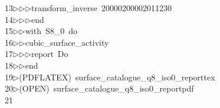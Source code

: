 \begin{tabbing}
13\>$\triangleright$\>$\triangleright$\>$\triangleright$\>transform\_inverse\ 20000200002011230\ \\[0pt]
14\>$\triangleright$\>$\triangleright$\>$\triangleright$\>end\ \\[0pt]
15\>$\triangleright$\>$\triangleright$\>with\ S8\_0\ do\ \\[0pt]
16\>$\triangleright$\>$\triangleright$\>cubic\_surface\_activity\ \\[0pt]
17\>$\triangleright$\>$\triangleright$\>$\triangleright$\>report\ Do\ \\[0pt]
18\>$\triangleright$\>$\triangleright$\>end\\[0pt]
19\>$\triangleright$\>(PDFLATEX)\ surface\_catalogue\_q8\_iso0\_reporttex\\[0pt]
20\>$\triangleright$\>(OPEN)\ surface\_catalogue\_q8\_iso0\_reportpdf\\[0pt]
21\>\end{tabbing}
